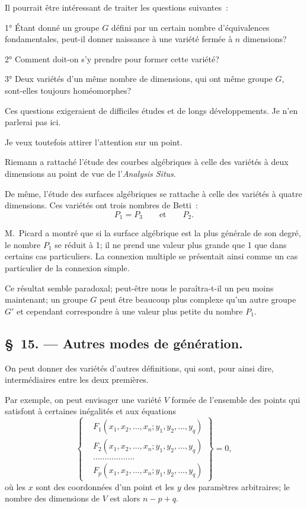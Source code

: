 \documentclass{article}
\begin{document}
Il pourrait être intéressant de traiter les questions suivantes~:

1° Étant donné un groupe $G$ défini par un certain nombre d'équivalences fondamentales, peut-il donner naissance à une variété fermée à $n$ dimensions?

2° Comment doit-on s'y prendre pour former cette variété?

3° Deux variétés d'un même nombre de dimensions, qui ont même groupe $G$, sont-elles toujours homéomorphes?

Ces questions exigeraient de difficiles études et de longs développements. Je n'en parlerai pas ici.

Je veux toutefois attirer l'attention sur un point.

Riemann a rattaché l'étude des courbes algébriques à celle des variétés à deux dimensions au point de vue de l'\emph{Analysis Situs}.

De même, l'étude des surfaces algébriques se rattache à celle des variétés à quatre dimensions. Ces variétés ont trois nombres de Betti~:
\[ P_{1} = P_{3} \qquad \text{et} \qquad P_{2}. \]

M.~Picard a montré que si la surface algébrique est la plus générale de son degré, le nombre $P_{1}$ se réduit à 1; il ne prend une valeur plus grande que 1 que dans certains cas particuliers. La connexion multiple se présentait ainsi comme un cas particulier de la connexion simple.

Ce résultat semble paradoxal; peut-être nous le paraîtra-t-il un peu moins maintenant; un groupe $G$ peut être beaucoup plus complexe qu'un autre groupe $G'$ et cependant correspondre à une valeur plus petite du nombre $P_{1}$.

\subsection*{\S~15. --- Autres modes de génération.}

On peut donner des variétés d'autres définitions, qui sont, pour ainsi dire, intermédiaires entre les deux premières.

Par exemple, on peut envisager une variété $V$ formée de l'ensemble des points qui satisfont à certaines inégalités et aux équations
\[ \left\{ \begin{aligned} &F_{1}(x_{1}, x_{2}, \ldots, x_{n}; y_{1}, y_{2}, \ldots, y_{q})\\ &F_{2}(x_{1}, x_{2}, \ldots, x_{n}; y_{1}, y_{2}, \ldots, y_{q})\\ &\ldots\ldots\ldots\ldots\ldots\ldots\\ &F_{p}(x_{1}, x_{2}, \ldots, x_{n}; y_{1}, y_{2}, \ldots, y_{q}) \end{aligned} \right\} = 0, \tag{1} \]
où les $x$ sont des coordonnées d'un point et les $y$ des paramètres arbitraires; le nombre des dimensions de $V$ est alors $n - p + q$.
\end{document}

